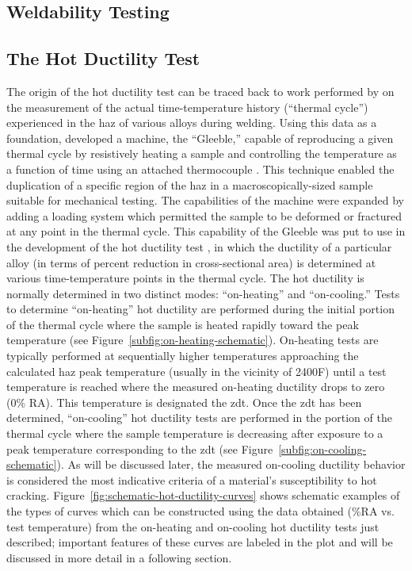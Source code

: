 \subsection{Weldability Testing}


\subsection{The Hot Ductility Test}
The origin of the hot ductility test can be traced back to work performed by \citet{nippes_cooling_1949} on the measurement of the actual time-temperature history (“thermal cycle”) experienced in the \gls{haz} of various alloys during welding.  Using this data as a foundation, \citeauthor{nippes_development_1949} developed a machine, the “Gleeble,” capable of reproducing a given thermal cycle by resistively heating a sample and controlling the temperature as a function of time using an attached thermocouple \cite{nippes_development_1949}. This technique enabled the duplication of a specific region of the \gls{haz} in a macroscopically-sized sample suitable for mechanical testing.  The capabilities of the machine were expanded by adding a loading system which permitted the sample to be deformed or fractured at any point in the thermal cycle.  This capability of the Gleeble was put to use in the development of the hot ductility test \cite{nippes_investigation_1955}, in which the ductility of a particular alloy (in terms of percent reduction in cross-sectional area) is determined at various time-temperature points in the thermal cycle.  The hot ductility is normally determined in two distinct modes: “on-heating” and “on-cooling.”  Tests to determine “on-heating” hot ductility are performed during the initial portion of the thermal cycle where the sample is heated rapidly toward the peak temperature (see Figure~\ref{subfig:on-heating-schematic}).  On-heating tests are typically performed at sequentially higher temperatures approaching the calculated \gls{haz} peak temperature (usually in the vicinity of 2400\textdegree{}F) until a test temperature is reached where the measured on-heating ductility drops to zero (0\% RA).  This temperature is designated the \gls{zdt}.  Once the \gls{zdt} has been determined, “on-cooling” hot ductility tests are performed in the portion of the thermal cycle where the sample temperature is decreasing after exposure to a peak temperature corresponding to the \gls{zdt} (see Figure~\ref{subfig:on-cooling-schematic}).  As will be discussed later, the measured on-cooling ductility behavior is considered the most indicative criteria of a material’s susceptibility to hot cracking.  Figure~\ref{fig:schematic-hot-ductility-curves} shows schematic examples of the types of curves which can be constructed using the data obtained (\%RA vs. test temperature) from the on-heating and on-cooling hot ductility tests just described; important features of these curves are labeled in the plot and will be discussed in more detail in a following section. 